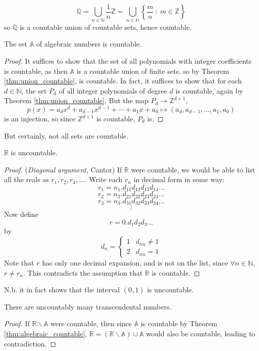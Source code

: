 \documentclass[10pt, a4paper, twoside]{report}
\begin{document}
\begin{example}
    \[\mathbb{Q}=\bigcup_{n\in\mathbb{N}}\frac 1n\mathbb{Z}=\bigcup_{n\in\mathbb{N}}\left\{\frac mn\::\:m\in\mathbb{Z}\right\}\]
    so \(\mathbb{Q}\) is a countable union of countable sets, hence countable.
\end{example}
\begin{theorem}
    The set \(\mathbb{A}\) of algebraic numbers is countable.
    \label{thm:algebraic_countable}
\end{theorem}
\begin{proof}
    It suffices to show that the set of all polynomials with integer coefficients is countable, as then \(\mathbb{A}\) is a countable union of finite sets, so by Theorem \ref{thm:union_countable}, is countable. In fact, it suffices to show that for each \(d\in\mathbb{N}\), the set \(P_d\) of all integer polynomials of degree \(d\) is countable, again by Theorem \ref{thm:union_countable}. But the map \(P_d\to\mathbb{Z}^{d+1}\),
    \[p(x)=a_dx^d+a_{d-1}x^{d-1}+\cdots+a_1x+a_0\mapsto (a_d,a_{d-1},\ldots,a_1,a_0)\]
    is an injection, so since \(\mathbb{Z}^{d+1}\) is countable, \(P_d\) is.
\end{proof}
But certainly, not all sets are countable.
\begin{theorem}
    \(\mathbb{R}\) is uncountable.
\end{theorem}
\begin{proof} (\emph{Diagonal argument}, Cantor)
    If \(\mathbb{R}\) were countable, we would be able to list all the reals as \(r_1,r_2,r_3,\ldots\). Write each \(r_n\) in decimal form in some way:
    \[r_1=n_1.d_{11}d_{12}d_{13}d_{14}\ldots\]
    \[r_2=n_2.d_{21}d_{22}d_{23}d_{24}\ldots\]
    \[r_3=n_3.d_{31}d_{32}d_{33}d_{34}\ldots\]
    \[\vdots\]
    Now define
\[r=0.d_1d_2d_3\ldots\]
by 
\[d_n=\begin{cases}
    1 & d_{nn}\neq 1 \\
    2 & d_{nn}=1
\end{cases}\]
Note that \(r\) has only one decimal expansion, and is not on the list, since \(\forall n\in\mathbb{N}\), \(r\neq r_n\). This contradicts the assumption that \(\mathbb{R}\) is countable.
\end{proof}
N.b. it in fact shows that the interval \((0,1)\) is uncountable.
\begin{corollary}
    There are uncountably many transcendental numbers.
\end{corollary}
\begin{proof}
    If \(\mathbb{R}\backslash\mathbb{A}\) were countable, then since \(\mathbb{A}\) is countable by Theorem \ref{thm:algebraic_countable}, \(\mathbb{R}=(\mathbb{R}\backslash\mathbb{A})\cup\mathbb{A}\) would also be countable, leading to contradiction.
\end{proof}
\end{document}
